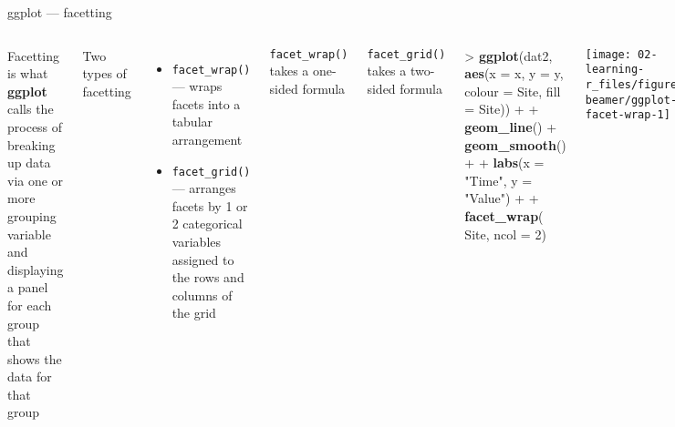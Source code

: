 \documentclass[10pt,ignorenonframetext,compress, aspectratio=169]{beamer}
\newenvironment{Shaded}{\begin{snugshade}}{\end{snugshade}}
\newcommand{\KeywordTok}[1]{\textcolor[rgb]{0.13,0.29,0.53}{\textbf{{#1}}}}
\newcommand{\DataTypeTok}[1]{\textcolor[rgb]{0.13,0.29,0.53}{{#1}}}
\newcommand{\DecValTok}[1]{\textcolor[rgb]{0.00,0.00,0.81}{{#1}}}
\newcommand{\StringTok}[1]{\textcolor[rgb]{0.31,0.60,0.02}{{#1}}}
\newcommand{\NormalTok}[1]{{#1}}
\providecommand{\tightlist}{%
  \setlength{\itemsep}{0pt}\setlength{\parskip}{0pt}}
\newcommand{\columnsbegin}{\begin{columns}}
\newcommand{\columnsend}{\end{columns}}
\begin{document}
\begin{frame}[fragile]{ggplot --- facetting}

\columnsbegin
{}

\alert{Facetting} is what \textbf{ggplot} calls the process of breaking
up data via one or more grouping variable and displaying a panel for
each group that shows the data for that group

Two types of facetting

\begin{itemize}
\tightlist
\item
  \texttt{facet\_wrap()} --- wraps facets into a tabular arrangement
\item
  \texttt{facet\_grid()} --- arranges facets by 1 or 2 categorical
  variables assigned to the rows and columns of the grid
\end{itemize}

\texttt{facet\_wrap()} takes a one-sided formula

\texttt{facet\_grid()} takes a two-sided formula


\begin{Shaded}
\begin{Highlighting}[]
\NormalTok{>}\StringTok{ }\KeywordTok{ggplot}\NormalTok{(dat2, }\KeywordTok{aes}\NormalTok{(}\DataTypeTok{x =} \NormalTok{x, }\DataTypeTok{y =} \NormalTok{y, }\DataTypeTok{colour =} \NormalTok{Site, }\DataTypeTok{fill =} \NormalTok{Site)) +}
\NormalTok{+}\StringTok{     }\KeywordTok{geom_line}\NormalTok{() +}\StringTok{ }\KeywordTok{geom_smooth}\NormalTok{() +}
\NormalTok{+}\StringTok{     }\KeywordTok{labs}\NormalTok{(}\DataTypeTok{x =} \StringTok{"Time"}\NormalTok{, }\DataTypeTok{y =} \StringTok{"Value"}\NormalTok{) +}
\NormalTok{+}\StringTok{     }\KeywordTok{facet_wrap}\NormalTok{( ~}\StringTok{ }\NormalTok{Site, }\DataTypeTok{ncol =} \DecValTok{2}\NormalTok{)}
\end{Highlighting}
\end{Shaded}

\begin{center}\texttt{[image: 02-learning-r\_files/figure-beamer/ggplot-facet-wrap-1]} \end{center}

\columnsend

\end{frame}
\end{document}

